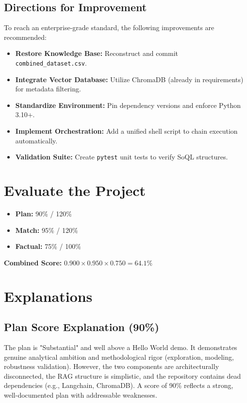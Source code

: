 \documentclass[12pt]{article}
\begin{document}
\subsection{Directions for Improvement}
To reach an enterprise-grade standard, the following improvements are recommended:
\begin{itemize}
    \item \textbf{Restore Knowledge Base:} Reconstruct and commit \texttt{combined\_dataset.csv}.
    \item \textbf{Integrate Vector Database:} Utilize ChromaDB (already in requirements) for metadata filtering.
    \item \textbf{Standardize Environment:} Pin dependency versions and enforce Python 3.10+.
    \item \textbf{Implement Orchestration:} Add a unified shell script to chain execution automatically.
    \item \textbf{Validation Suite:} Create \texttt{pytest} unit tests to verify SoQL structures.
\end{itemize}

\section{Evaluate the Project}
\begin{itemize}
    \item \textbf{Plan:} 90\% / 120\%
    \item \textbf{Match:} 95\% / 120\%
    \item \textbf{Factual:} 75\% / 100\%
\end{itemize}
\textbf{Combined Score:} $0.900 \times 0.950 \times 0.750 = 64.1\%$

\section{Explanations}

\subsection{Plan Score Explanation (90\%)}
The plan is "Substantial" and well above a Hello World demo. It demonstrates genuine analytical ambition and methodological rigor (exploration, modeling, robustness validation). However, the two components are architecturally disconnected, the RAG structure is simplistic, and the repository contains dead dependencies (e.g., Langchain, ChromaDB). A score of 90\% reflects a strong, well-documented plan with addressable weaknesses.
\end{document}
